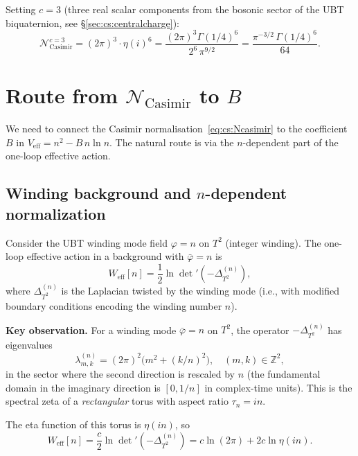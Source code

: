 \documentclass[12pt,a4paper]{article}
\theoremstyle{definition}
\theoremstyle{remark}
\begin{document}
Setting $c = 3$ (three real scalar components from the bosonic sector of
the UBT biquaternion, see §\ref{sec:cs:centralcharge}):
\begin{equation}
  \mathcal{N}_{\mathrm{Casimir}}^{c=3}
  = (2\pi)^3 \cdot \eta(i)^6
  = \frac{(2\pi)^3 \Gamma(1/4)^6}{2^6\,\pi^{9/2}}
  = \frac{\pi^{-3/2}\,\Gamma(1/4)^6}{64}.
  \label{eq:cs:Ncasimir3}
\end{equation}

\section{Route from $\mathcal{N}_{\mathrm{Casimir}}$ to $B$}
\label{sec:cs:route}

We need to connect the Casimir normalisation~\eqref{eq:cs:Ncasimir} to the
coefficient $B$ in $V_{\mathrm{eff}} = n^2 - B\,n\ln n$.  The natural route
is via the $n$-dependent part of the one-loop effective action.

\subsection{Winding background and $n$-dependent normalization}

Consider the UBT winding mode field $\varphi = n$ on $T^2$ (integer winding).
The one-loop effective action in a background with $\bar\varphi = n$ is
\begin{equation}
  W_{\mathrm{eff}}[n]
  = \frac{1}{2}\ln\det'(-\Delta_{T^2}^{(n)}),
  \label{eq:cs:Weffn}
\end{equation}
where $\Delta_{T^2}^{(n)}$ is the Laplacian twisted by the winding mode
(i.e., with modified boundary conditions encoding the winding number $n$).

\begin{insightbox}
\textbf{Key observation.}
For a winding mode $\bar\varphi = n$ on $T^2$, the operator
$-\Delta_{T^2}^{(n)}$ has eigenvalues
\[
  \lambda_{m,k}^{(n)} = (2\pi)^2\bigl(m^2 + (k/n)^2\bigr),
  \quad (m,k)\in\mathbb{Z}^2,
\]
in the sector where the second direction is rescaled by $n$ (the fundamental
domain in the imaginary direction is $[0,1/n]$ in complex-time units).
This is the spectral zeta of a \emph{rectangular} torus with aspect ratio
$\tau_n = in$.

The eta function of this torus is $\eta(in)$, so
\begin{equation}
  W_{\mathrm{eff}}[n]
  = \frac{c}{2}\ln\det'(-\Delta_{T^2}^{(n)})
  = c\ln(2\pi) + 2c\ln\eta(in).
  \label{eq:cs:Weffn2}
\end{equation}
\end{insightbox}
\end{document}
